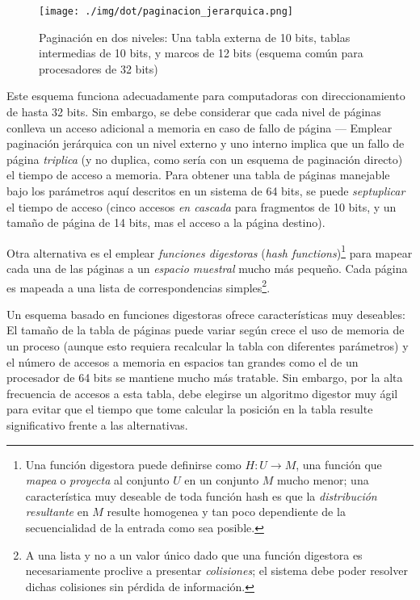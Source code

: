 \documentclass[11pt,fleqn]{book} %
\begin{document}
\begin{figure}[htb]
\centering
\texttt{[image: ./img/dot/paginacion\_jerarquica.png]}
\caption{\label{MEM_paginacion_jerarquica}Paginación en dos niveles: Una tabla externa de 10 bits, tablas intermedias de 10 bits, y marcos de 12 bits (esquema común para procesadores de 32 bits)}
\end{figure}

Este esquema funciona adecuadamente para computadoras con direccionamiento
de hasta 32 bits. Sin embargo, se debe considerar que cada nivel de páginas
conlleva un acceso adicional a memoria en caso de fallo de página —
Emplear paginación jerárquica con un nivel externo y uno interno
implica que un fallo de página \emph{triplica} (y no duplica, como sería
con un esquema de paginación directo) el tiempo de acceso a
memoria. Para obtener una tabla de páginas manejable bajo los
parámetros aquí descritos en un sistema de 64 bits, se puede
\emph{septuplicar} el tiempo de acceso (cinco accesos \emph{en cascada} para
fragmentos de 10 bits, y un tamaño de página de 14 bits, mas el acceso
a la página destino).

Otra alternativa es el emplear \emph{funciones digestoras} (\emph{hash functions})\footnote{Una función digestora puede definirse como $H:
U\rightarrow M$, una función que \emph{mapea} o \emph{proyecta} al conjunto $U$
en un conjunto $M$ mucho menor; una característica muy deseable de
toda función hash es que la \emph{distribución resultante} en $M$ resulte
homogenea y tan poco dependiente de la secuencialidad de la entrada
como sea posible. } para mapear cada una de las páginas a un \emph{espacio muestral} mucho más pequeño. Cada página es mapeada a una lista de
correspondencias simples\footnote{A una lista y no a un valor único dado
que una función digestora es necesariamente proclive a presentar
\emph{colisiones}; el sistema debe poder resolver dichas colisiones sin
pérdida de información. }.

Un esquema basado en funciones digestoras ofrece características
muy deseables: El tamaño de la tabla de páginas puede variar según
crece el uso de memoria de un proceso (aunque esto requiera recalcular
la tabla con diferentes parámetros) y el número de accesos a memoria
en espacios tan grandes como el de un procesador de 64 bits se
mantiene mucho más tratable. Sin embargo, por la alta frecuencia de
accesos a esta tabla, debe elegirse un algoritmo digestor muy ágil
para evitar que el tiempo que tome calcular la posición en la tabla
resulte significativo frente a las alternativas.
\end{document}
